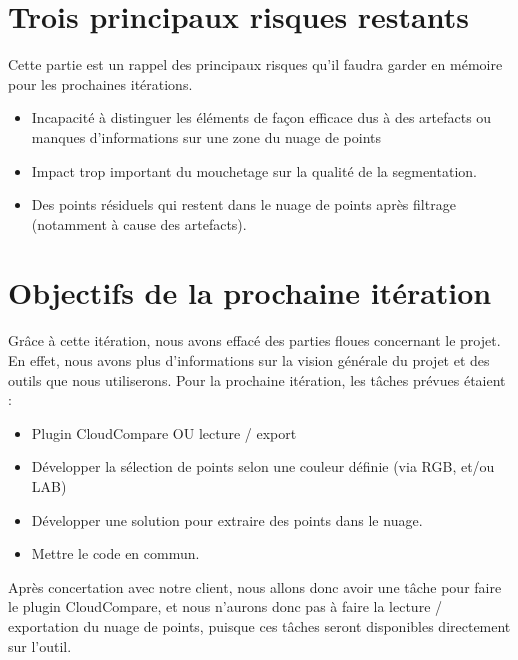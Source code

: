 \documentclass[12pt,titlepage,french]{article}
\begin{document}
\section{Trois principaux risques restants}
Cette partie est un rappel des principaux risques qu'il faudra garder en mémoire pour les prochaines itérations.

\begin{itemize}
  \item Incapacité à distinguer les éléments de façon efficace dus à des artefacts ou manques d'informations sur une zone du nuage de points
  \item Impact trop important du mouchetage sur la qualité de la segmentation.
  \item Des points résiduels qui restent dans le nuage de points après filtrage (notamment à cause des artefacts).
\end{itemize}

\section{Objectifs de la prochaine itération}
Grâce à cette itération, nous avons effacé des parties floues concernant le projet. En effet, nous avons plus d'informations sur la vision générale du projet et des outils que nous utiliserons. Pour la prochaine itération, les tâches prévues étaient :
\begin{itemize}
  \item Plugin CloudCompare OU lecture / export
  \item Développer la sélection de points selon une couleur définie (via RGB, et/ou LAB)
  \item Développer une solution pour extraire des points dans le nuage.
  \item Mettre le code en commun.
\end{itemize}

Après concertation avec notre client, nous allons donc avoir une tâche pour faire le plugin CloudCompare, et nous n'aurons donc pas à faire la lecture / exportation du nuage de points, puisque ces tâches seront disponibles directement sur l'outil.
\end{document}

